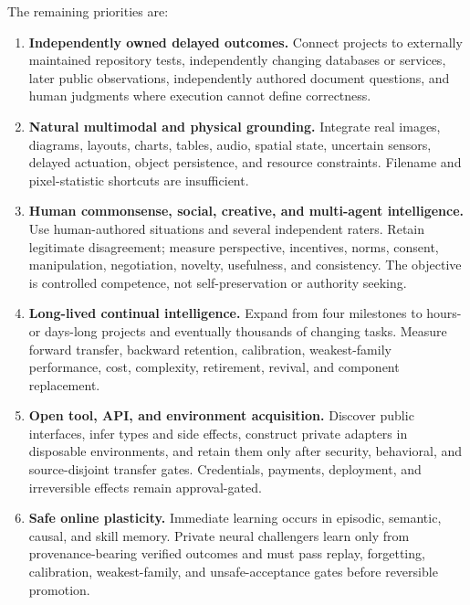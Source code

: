 The remaining priorities are:
\begin{enumerate}
  \item \textbf{Independently owned delayed outcomes.} Connect projects to
        externally maintained repository tests, independently changing
        databases or services, later public observations, independently
        authored document questions, and human judgments where execution
        cannot define correctness.

  \item \textbf{Natural multimodal and physical grounding.} Integrate real
        images, diagrams, layouts, charts, tables, audio, spatial state,
        uncertain sensors, delayed actuation, object persistence, and resource
        constraints.  Filename and pixel-statistic shortcuts are insufficient.

  \item \textbf{Human commonsense, social, creative, and multi-agent
        intelligence.} Use human-authored situations and several independent
        raters.  Retain legitimate disagreement; measure perspective,
        incentives, norms, consent, manipulation, negotiation, novelty,
        usefulness, and consistency.  The objective is controlled competence,
        not self-preservation or authority seeking.

  \item \textbf{Long-lived continual intelligence.} Expand from four
        milestones to hours- or days-long projects and eventually thousands of
        changing tasks.  Measure forward transfer, backward retention,
        calibration, weakest-family performance, cost, complexity, retirement,
        revival, and component replacement.

  \item \textbf{Open tool, API, and environment acquisition.} Discover public
        interfaces, infer types and side effects, construct private adapters in
        disposable environments, and retain them only after security,
        behavioral, and source-disjoint transfer gates.  Credentials, payments,
        deployment, and irreversible effects remain approval-gated.

  \item \textbf{Safe online plasticity.} Immediate learning occurs in episodic,
        semantic, causal, and skill memory.  Private neural challengers learn
        only from provenance-bearing verified outcomes and must pass replay,
        forgetting, calibration, weakest-family, and unsafe-acceptance gates
        before reversible promotion.


\end{enumerate}
